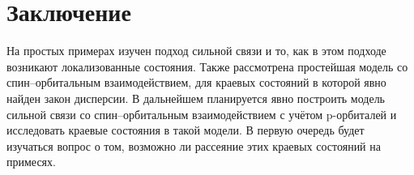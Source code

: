 \section{Заключение}
На простых примерах изучен подход сильной связи и то, как в этом подходе
возникают локализованные состояния. Также рассмотрена простейшая модель
со спин--орбитальным взаимодействием, для краевых состояний в которой явно 
найден закон дисперсии. 
В дальнейшем планируется явно построить модель сильной связи 
со спин--орбитальным взаимодействием с учётом p-орбиталей
и исследовать краевые состояния в такой модели. В первую очередь будет  
изучаться вопрос о том, 
возможно ли рассеяние этих краевых состояний на примесях. 
